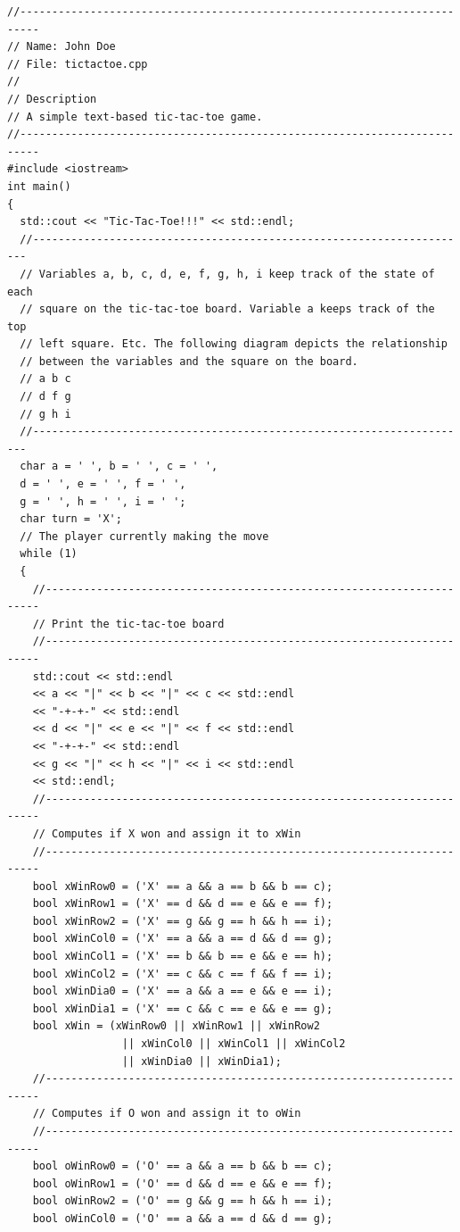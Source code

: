 \begin{Verbatim}[frame=single, fontsize=\footnotesize]
//-------------------------------------------------------------------------
// Name: John Doe
// File: tictactoe.cpp
//
// Description
// A simple text-based tic-tac-toe game.
//-------------------------------------------------------------------------
#include <iostream>
int main()
{
  std::cout << "Tic-Tac-Toe!!!" << std::endl;
  //---------------------------------------------------------------------
  // Variables a, b, c, d, e, f, g, h, i keep track of the state of each
  // square on the tic-tac-toe board. Variable a keeps track of the top
  // left square. Etc. The following diagram depicts the relationship
  // between the variables and the square on the board.
  // a b c
  // d f g
  // g h i
  //---------------------------------------------------------------------
  char a = ' ', b = ' ', c = ' ',
  d = ' ', e = ' ', f = ' ',
  g = ' ', h = ' ', i = ' ';
  char turn = 'X';
  // The player currently making the move
  while (1)
  {
    //---------------------------------------------------------------------
    // Print the tic-tac-toe board
    //---------------------------------------------------------------------
    std::cout << std::endl
    << a << "|" << b << "|" << c << std::endl
    << "-+-+-" << std::endl
    << d << "|" << e << "|" << f << std::endl
    << "-+-+-" << std::endl
    << g << "|" << h << "|" << i << std::endl
    << std::endl;
    //---------------------------------------------------------------------
    // Computes if X won and assign it to xWin
    //---------------------------------------------------------------------
    bool xWinRow0 = ('X' == a && a == b && b == c);
    bool xWinRow1 = ('X' == d && d == e && e == f);
    bool xWinRow2 = ('X' == g && g == h && h == i);
    bool xWinCol0 = ('X' == a && a == d && d == g);
    bool xWinCol1 = ('X' == b && b == e && e == h);
    bool xWinCol2 = ('X' == c && c == f && f == i);
    bool xWinDia0 = ('X' == a && a == e && e == i);
    bool xWinDia1 = ('X' == c && c == e && e == g);
    bool xWin = (xWinRow0 || xWinRow1 || xWinRow2
                  || xWinCol0 || xWinCol1 || xWinCol2
                  || xWinDia0 || xWinDia1);
    //---------------------------------------------------------------------
    // Computes if O won and assign it to oWin
    //---------------------------------------------------------------------
    bool oWinRow0 = ('O' == a && a == b && b == c);
    bool oWinRow1 = ('O' == d && d == e && e == f);
    bool oWinRow2 = ('O' == g && g == h && h == i);
    bool oWinCol0 = ('O' == a && a == d && d == g);

\end{Verbatim}
